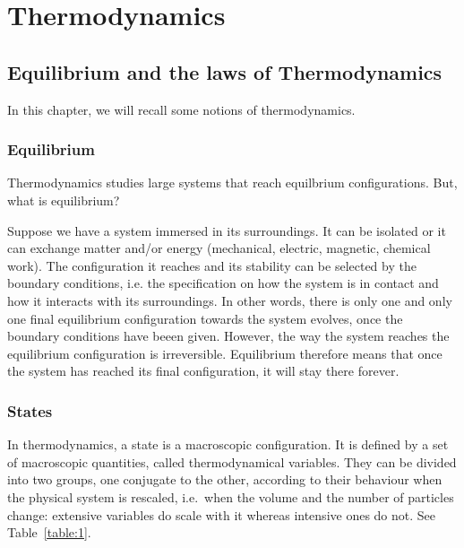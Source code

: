\part{Thermodynamics}

\chapter{Equilibrium and the laws of Thermodynamics}

    In this chapter, we will recall some notions of thermodynamics.

\section{Equilibrium}

    Thermodynamics studies large systems that reach equilbrium configurations. But, what is equilibrium? 

    Suppose we have a system immersed in its surroundings. It can be isolated or it can exchange matter and/or energy (mechanical, electric, magnetic, chemical work). The configuration it reaches and its stability can be selected by the boundary conditions, i.e. the specification on how the system is in contact and how it interacts with its surroundings. In other words, there is only one and only one final equilibrium configuration towards the system evolves, once the boundary conditions have beeen given. However, the way the system reaches the equilibrium configuration is irreversible. Equilibrium therefore means that once the system has reached its final configuration, it will stay there forever. 

\section{States}

    In thermodynamics, a state is a macroscopic configuration. It is defined by a set of macroscopic quantities, called thermodynamical variables. They can be divided into two groups, one conjugate to the other, according to their behaviour when the physical system is rescaled, i.e.~when the volume and the number of particles change: extensive variables do scale with it whereas intensive ones do not. See Table~\ref{table:1}. 
    
